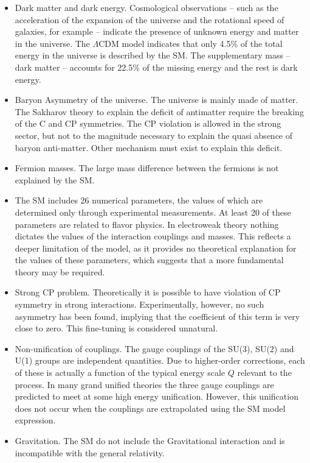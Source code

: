 \documentclass[../main.tex]{subfiles}
\begin{document}
\begin{itemize}
  \item Dark matter and dark energy. Cosmological observations -- such as the acceleration of the expansion of the universe and the rotational speed of galaxies, for example -- indicate the presence of unknown energy and matter in the universe. The $\Lambda$CDM model \cite{bull_beyond_2016, perivolaropoulos_challenges_2022} indicates that only 4.5\% of the total energy in the universe is described by the SM. The supplementary mass -- dark matter -- accounts for 22.5\% of the missing energy and the rest is dark energy.
  \item Baryon Asymmetry of the universe. The universe is mainly made of matter. The Sakharov theory \cite{sakharov_violation_1991} to explain the deficit of antimatter require the breaking of the C and CP symmetries. The CP violation is allowed in the strong sector, but not to the magnitude necessary to explain the quasi absence of baryon anti-matter. Other mechanism must exist to explain this deficit.
  \item Fermion masses. The large mass difference between the fermions is not explained by the SM.
  \item The SM includes 26 numerical parameters, the values of which are determined only through experimental measurements. At least 20 of these parameters are related to flavor physics. In electroweak theory nothing dictates the values of the interaction couplings and masses. This reflects a deeper limitation of the model, as it provides no theoretical explanation for the values of these parameters, which suggests that a more fundamental theory may be required.
  \item Strong CP problem. Theoretically it is possible to have violation of CP symmetry in strong interactions. Experimentally, however, no such asymmetry has been found, implying that the coefficient of this term is very close to zero. This fine-tuning is considered unnatural.
  \item Non-unification of couplings. The gauge couplings of the SU(3), SU(2) and U(1) groups are independent quantities. Due to higher-order corrections, each of these is actually a function of the typical energy scale $Q$ relevant to the process. In many grand unified theories the three gauge couplings are predicted to meet at some high energy unification. However, this unification does not occur when the couplings are extrapolated using the SM model expression.
  \item Gravitation. The SM do not include the Gravitational interaction and is incompatible with the general relativity.
\end{itemize}
\end{document}
